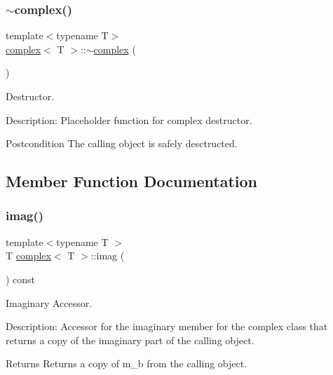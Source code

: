 \subsubsection{\texorpdfstring{$\sim$complex()}{~complex()}}
{\footnotesize\ttfamily template$<$typename T$>$ \\
\hyperlink{classcomplex}{complex}$<$ T $>$\+::$\sim$\hyperlink{classcomplex}{complex} (\begin{DoxyParamCaption}{ }\end{DoxyParamCaption})\hspace{0.3cm}{\ttfamily [inline]}}



Destructor. 

Description\+: Placeholder function for complex destructor. \begin{DoxyPostcond}{Postcondition}
The calling object is safely desctructed. 
\end{DoxyPostcond}


\subsection{Member Function Documentation}
\mbox{\label{classcomplex_a4edf203a6e7005a5d6817473d703a423}} 
\subsubsection{\texorpdfstring{imag()}{imag()}}
{\footnotesize\ttfamily template$<$typename T $>$ \\
T \hyperlink{classcomplex}{complex}$<$ T $>$\+::imag (\begin{DoxyParamCaption}{ }\end{DoxyParamCaption}) const}



Imaginary Accessor. 

Description\+: Accessor for the imaginary member for the complex class that returns a copy of the imaginary part of the calling object. \begin{DoxyReturn}{Returns}
Returns a copy of m\+\_\+b from the calling object. 
\end{DoxyReturn}
\mbox{\label{classcomplex_a0a6eb0b21f6f7d0084c7edc637e98e10}} 
